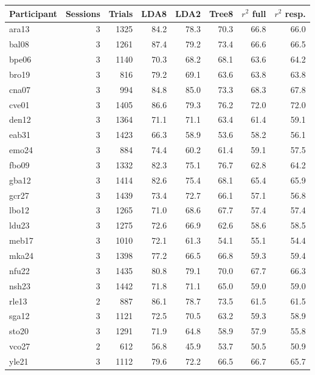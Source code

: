 \begin{tabular}{@{}lrrrrrrr@{}}
\toprule
Participant & Sessions & Trials & LDA8 & LDA2 & Tree8 & $r^2$ full & $r^2$ resp. \\
\midrule
ara13 & 3 & 1325 & 84.2 & 78.3 & 70.3 & 66.8 & 66.0 \\
bal08 & 3 & 1261 & 87.4 & 79.2 & 73.4 & 66.6 & 66.5 \\
bpe06 & 3 & 1140 & 70.3 & 68.2 & 68.1 & 63.6 & 64.2 \\
bro19 & 3 & 816 & 79.2 & 69.1 & 63.6 & 63.8 & 63.8 \\
cna07 & 3 & 994 & 84.8 & 85.0 & 73.3 & 68.3 & 67.8 \\
cve01 & 3 & 1405 & 86.6 & 79.3 & 76.2 & 72.0 & 72.0 \\
den12 & 3 & 1364 & 71.1 & 71.1 & 63.4 & 61.4 & 59.1 \\
eab31 & 3 & 1423 & 66.3 & 58.9 & 53.6 & 58.2 & 56.1 \\
emo24 & 3 & 884 & 74.4 & 60.2 & 61.4 & 59.1 & 57.5 \\
fbo09 & 3 & 1332 & 82.3 & 75.1 & 76.7 & 62.8 & 64.2 \\
gba12 & 3 & 1414 & 82.6 & 75.4 & 68.1 & 65.4 & 65.9 \\
gcr27 & 3 & 1439 & 73.4 & 72.7 & 66.1 & 57.1 & 56.8 \\
lbo12 & 3 & 1265 & 71.0 & 68.6 & 67.7 & 57.4 & 57.4 \\
ldu23 & 3 & 1275 & 72.6 & 66.9 & 62.6 & 58.6 & 58.5 \\
meb17 & 3 & 1010 & 72.1 & 61.3 & 54.1 & 55.1 & 54.4 \\
mka24 & 3 & 1398 & 77.2 & 66.5 & 66.8 & 59.3 & 59.4 \\
nfu22 & 3 & 1435 & 80.8 & 79.1 & 70.0 & 67.7 & 66.3 \\
nsh23 & 3 & 1442 & 71.8 & 71.1 & 65.0 & 59.0 & 59.0 \\
rle13 & 2 & 887 & 86.1 & 78.7 & 73.5 & 61.5 & 61.5 \\
sga12 & 3 & 1121 & 72.5 & 70.5 & 63.2 & 59.3 & 58.9 \\
sto20 & 3 & 1291 & 71.9 & 64.8 & 58.9 & 57.9 & 55.8 \\
vco27 & 2 & 612 & 56.8 & 45.9 & 53.7 & 50.5 & 50.9 \\
yle21 & 3 & 1112 & 79.6 & 72.2 & 66.5 & 66.7 & 65.7 \\
\bottomrule
\end{tabular}
